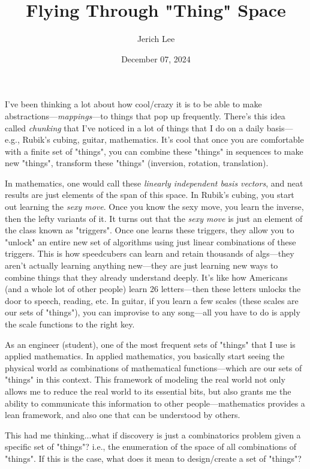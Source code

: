 \documentclass[12pt]{article}
\title{Flying Through "Thing" Space}
\author{Jerich Lee}
\date{December 07, 2024}
\theoremstyle{definition} %
\theoremstyle{plain} %
\begin{document}
\maketitle

I've been thinking a lot about how cool/crazy it is to be able to make abstractions—\emph{mappings}—to things that pop up frequently. There's this idea
called \emph{chunking} that I've noticed in a lot of things that I do on a daily basis—e.g., Rubik's cubing, guitar, mathematics. It's cool that once you 
are comfortable with a finite set of "things", you can combine these "things" in sequences to make new "things", transform these "things" (inversion, rotation, translation). 

In mathematics, one would call these \emph{linearly independent basis vectors}, and neat results are just elements of the span of this space.
In Rubik's cubing, you start out learning the \emph{sexy move}. Once you know the sexy move, you learn the inverse, then the lefty variants of it. It turns out that the \emph{sexy move} is just an element of the class known as "triggers". Once one learns these triggers, they 
allow you to "unlock" an entire new set of algorithms using just linear combinations of these triggers. This is how speedcubers can learn and retain thousands of algs—they aren't actually learning anything new—they are just learning new ways to combine things that they already understand deeply. It's like how Americans (and a whole lot of other people) learn 26 letters—then these letters unlocks the 
door to speech, reading, etc. In guitar, if you learn a few scales (these scales are our sets of "things"), you can improvise to any song—all you have to do is apply the scale functions to the right key.
    

As an engineer (student), one of the most frequent sets of "things" that I use is applied mathematics. In applied mathematics, you basically start seeing the physical world as combinations of mathematical functions—which are our sets of "things" in this context. This framework of modeling the real world not only allows me to reduce the real world to its essential bits, but also grants me the ability to communicate this information to other people—mathematics provides a lean framework, and also one that can be understood by others.

This had me thinking...what if discovery is just a combinatorics problem given a specific set of "things"? i.e., the enumeration of the space of all combinations of "things". If this is the case, what does it mean to design/create a set of "things"? 
\end{document}
